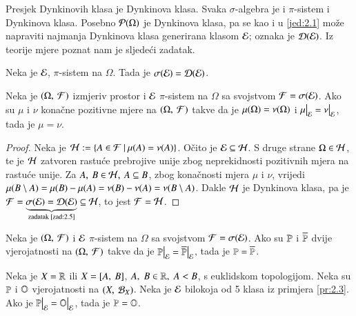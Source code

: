 Presjek Dynkinovih klasa je Dynkinova klasa.
Svaka $\sigma$-algebra je i $\pi$-sistem i Dynkinova klasa.
Posebno $\mathcal{P}({\Omega})$ je Dynkinova klasa, pa se kao i u \eqref{jed:2.1} mo\v ze napraviti najmanja Dynkinova klasa generirana klasom $\mathcal{E}$; oznaka je $\mathcal{D}({\mathcal{E}})$.
Iz teorije mjere poznat nam je sljede\' ci zadatak.

\begin{zad}   \label{zad:2.5}
    Neka je $\mathcal{E}$, $\pi$-sistem na $\Omega$.
    Tada je $\sigma({\mathcal{E}}) = \mathcal{D}({\mathcal{E}})$.    
\end{zad}

%
%

\begin{tm}  \label{tm:2.6}
    Neka je $(\Omega, \: \mathcal{F})$ izmjeriv prostor i $\mathcal{E}$ $\pi$-sistem na $\Omega$ sa svojstvom $\mathcal{F} = \sigma({\mathcal{E}})$.
    Ako su $\mu$ i $\nu$ kona\v cne pozitivne mjere na $(\Omega, \: \mathcal{F})$ takve da je $\mu({\Omega}) = \nu(\Omega)$ i $\restr{\mu}{\famE} = \restr{\nu}{\famE}$, tada je $\mu = \nu$.   
\end{tm}

\begin{proof}
    Neka je $\mathcal{H} := \{{A \in \mathcal{F}} \: | \: {\mu({A}) = \nu(A)}\}$.
    O\v cito je $\mathcal{E} \subseteq \mathcal{H}$. S druge strane $\Omega \in \mathcal{H}$, te je $\mathcal{H}$ zatvoren rastu\' ce prebrojive unije zbog neprekidnosti pozitivnih mjera na rastu\' ce unije.
    Za $A, \: B \in \mathcal{H}, \: A \subseteq B$, zbog kona\v cnosti mjera $\mu$ i $\nu$, vrijedi $\mu({B \setminus A}) = \mu({B}) - \mu({A}) = \nu(B) - \nu(A) = \nu(B \setminus A)$.
    Dakle $\mathcal{H}$ je Dynkinova klasa, pa je $\mathcal{F} = \underbrace{\sigma({\mathcal{E}}) = \mathcal{D}({\mathcal{E}})}_{\textnormal{zadatak \ref{zad:2.5}}} \subseteq \mathcal{H}$, to jest $\mathcal{F} = \mathcal{H}$.
\end{proof}

\begin{kor} \label{kor:2.7}
    Neka je $(\Omega, \: \mathcal{F})$ i $\mathcal{E}$ $\pi$-sistem na $\Omega$ sa svojstvom $\mathcal{F} = \sigma({\mathcal{E}})$.
    Ako su $\mathbb{P}$ i $\overline{\mathbb{P}}$ dvije vjerojatnosti na $(\Omega, \: \mathcal{F})$ takve da je $\restr{\masP}{\famE} = \restr{\overline{\masP}}{\famE}$, tada je $\mathbb{P}
    = \overline{\mathbb{P}}$.
\end{kor}

\begin{kor} \label{kor:2.8}
    Neka je $X = \mathbb{R}$ ili $X = [{A}, \:{B}]$, $A, \; B \in \mathbb{R}, \; A < B$, s euklidskom topologijom.
    Neka su $\mathbb{P}$ i $\mathbb{O}$ vjerojatnosti na $({X}, \: {\mathcal{B}_{X}})$.
    Neka je $\mathcal{E}$ bilokoja od 5 klasa iz primjera \ref{pr:2.3}.
    Ako je $\restr{\masP}{\famE} = \restr{\masO}{\famE}$, tada je $\mathbb{P} = \mathbb{O}$.
\end{kor}

